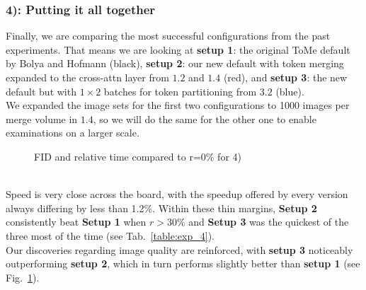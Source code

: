 \subsubsection*{4): Putting it all together}
Finally, we are comparing the most successful configurations from the past experiments. That means we are looking at \textbf{setup 1}: the original ToMe default by Bolya and Hofmann (black), \textbf{setup 2}: our new default with token merging expanded to the cross-attn layer from \(1.2\) and \(1.4\) (red), and \textbf{setup 3}: the new default but with $1 \times 2$ batches for token partitioning from \(3.2\) (blue).\\
We expanded the image sets for the first two configurations to 1000 images per merge volume in \(1.4\), so we will do the same for the other one to enable examinations on a larger scale.
\begin{figure}[!htb]
    
    
\caption{FID and relative time compared to r=0\% for 4)}
\label{fig:exp_4}
\end{figure}\\
Speed is very close across the board, with the speedup offered by every version always differing by less than 1.2\%. Within these thin margins, \textbf{Setup 2} consistently beat \textbf{Setup 1} when \(r>30\%\) and \textbf{Setup 3} was the quickest of the three most of the time (see Tab.~\ref{table:exp_4}).\\
Our discoveries regarding image quality are reinforced, with \textbf{setup 3} noticeably outperforming \textbf{setup 2}, which in turn performs slightly better than \textbf{setup 1} (see Fig.~\ref{fig:exp_4}).\\
